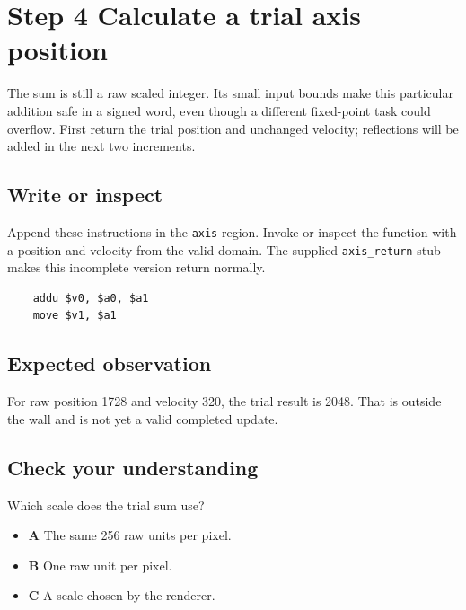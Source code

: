 \section{Step 4 Calculate a trial axis position}\label{ball-s04}

The sum is still a raw scaled integer. Its small input bounds make this particular addition safe in a signed word, even though a different fixed-point task could overflow. First return the trial position and unchanged velocity; reflections will be added in the next two increments.

\subsection{Write or inspect}
Append these instructions in the \texttt{axis} region. Invoke or inspect the function with a position and velocity from the valid domain. The supplied \texttt{axis\_return} stub makes this incomplete version return normally.

\begin{verbatim}
    addu $v0, $a0, $a1
    move $v1, $a1
\end{verbatim}

\subsection{Expected observation}
For raw position 1728 and velocity 320, the trial result is 2048. That is outside the wall and is not yet a valid completed update.

\subsection{Check your understanding}
Which scale does the trial sum use?

\begin{itemize}
  \item \textbf{A} The same 256 raw units per pixel.
  \item \textbf{B} One raw unit per pixel.
  \item \textbf{C} A scale chosen by the renderer.
\end{itemize}
